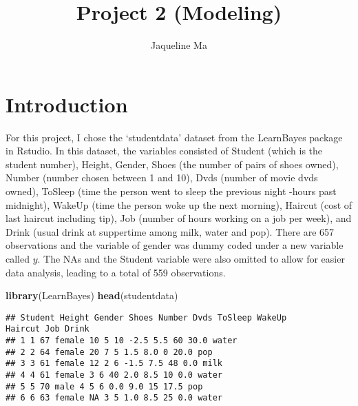 \documentclass[]{article}
\title{Project 2 (Modeling)}
\author{Jaqueline Ma}
\date{}
\newenvironment{Shaded}{\begin{snugshade}}{\end{snugshade}}
\newcommand{\DataTypeTok}[1]{\textcolor[rgb]{0.13,0.29,0.53}{#1}}
\newcommand{\DecValTok}[1]{\textcolor[rgb]{0.00,0.00,0.81}{#1}}
\newcommand{\KeywordTok}[1]{\textcolor[rgb]{0.13,0.29,0.53}{\textbf{#1}}}
\newcommand{\NormalTok}[1]{#1}
\newcommand{\OperatorTok}[1]{\textcolor[rgb]{0.81,0.36,0.00}{\textbf{#1}}}
\newcommand{\OtherTok}[1]{\textcolor[rgb]{0.56,0.35,0.01}{#1}}
\newcommand{\StringTok}[1]{\textcolor[rgb]{0.31,0.60,0.02}{#1}}
\begin{document}
\maketitle

\hypertarget{introduction}{%
\section{Introduction}\label{introduction}}

For this project, I chose the `studentdata' dataset from the LearnBayes
package in Rstudio. In this dataset, the variables consisted of Student
(which is the student number), Height, Gender, Shoes (the number of
pairs of shoes owned), Number (number chosen between 1 and 10), Dvds
(number of movie dvds owned), ToSleep (time the person went to sleep the
previous night -hours past midnight), WakeUp (time the person woke up
the next morning), Haircut (cost of last haircut including tip), Job
(number of hours working on a job per week), and Drink (usual drink at
suppertime among milk, water and pop). There are 657 observations and
the variable of gender was dummy coded under a new variable called
\(y\). The NAs and the Student variable were also omitted to allow for
easier data analysis, leading to a total of 559 observations.

\begin{Shaded}
\begin{Highlighting}[]
\KeywordTok{library}\NormalTok{(LearnBayes)}
\KeywordTok{head}\NormalTok{(studentdata)}
\end{Highlighting}
\end{Shaded}

\begin{verbatim}
## Student Height Gender Shoes Number Dvds ToSleep WakeUp
Haircut Job Drink
## 1 1 67 female 10 5 10 -2.5 5.5 60 30.0 water
## 2 2 64 female 20 7 5 1.5 8.0 0 20.0 pop
## 3 3 61 female 12 2 6 -1.5 7.5 48 0.0 milk
## 4 4 61 female 3 6 40 2.0 8.5 10 0.0 water
## 5 5 70 male 4 5 6 0.0 9.0 15 17.5 pop
## 6 6 63 female NA 3 5 1.0 8.5 25 0.0 water
\end{verbatim}

\begin{Shaded}
\end{Shaded}
\end{document}
